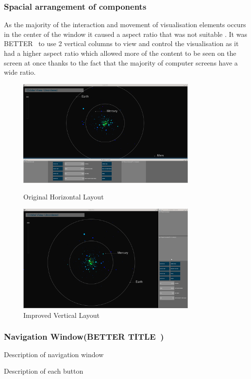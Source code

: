 \subsubsection{Spacial arrangement of components}
As the majority of the interaction and movement of visualisation elements occurs in the center of the window it caused a aspect ratio that was not suitable . It was BETTER~ to use 2 vertical columns to view and control the visualisation as it had a higher aspect ratio which allowed more of the content to be seen on the screen at once thanks to the fact that the majority of computer screens have a wide ratio.

\begin{figure}[h!]
  \centering
      \includegraphics[width=0.8\textwidth]{images/layout_horizontal.jpg}
  \caption{Original Horizontal Layout}  
        \includegraphics[width=0.8\textwidth]{images/layout_vertical.jpg}
  \caption{Improved Vertical Layout}
\end{figure}

\subsubsection{Navigation Window(BETTER TITLE~)}
Description of navigation window

Description of each button

